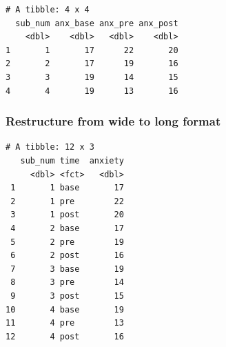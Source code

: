 \documentclass[
]{article}
\newenvironment{Shaded}{\begin{snugshade}}{\end{snugshade}}
\newcommand{\CommentTok}[1]{\textcolor[rgb]{0.56,0.35,0.01}{\textit{#1}}}
\newcommand{\DataTypeTok}[1]{\textcolor[rgb]{0.13,0.29,0.53}{#1}}
\newcommand{\DecValTok}[1]{\textcolor[rgb]{0.00,0.00,0.81}{#1}}
\newcommand{\KeywordTok}[1]{\textcolor[rgb]{0.13,0.29,0.53}{\textbf{#1}}}
\newcommand{\NormalTok}[1]{#1}
\newcommand{\OperatorTok}[1]{\textcolor[rgb]{0.81,0.36,0.00}{\textbf{#1}}}
\newcommand{\StringTok}[1]{\textcolor[rgb]{0.31,0.60,0.02}{#1}}
\begin{document}
\begin{verbatim}
# A tibble: 4 x 4
  sub_num anx_base anx_pre anx_post
    <dbl>    <dbl>   <dbl>    <dbl>
1       1       17      22       20
2       2       17      19       16
3       3       19      14       15
4       4       19      13       16
\end{verbatim}

\hypertarget{restructure-from-wide-to-long-format-5}{%
\subsubsection{Restructure from wide to long
format}\label{restructure-from-wide-to-long-format-5}}

\begin{Shaded}
\end{Shaded}

\begin{Shaded}
\end{Shaded}

\begin{verbatim}
# A tibble: 12 x 3
   sub_num time  anxiety
     <dbl> <fct>   <dbl>
 1       1 base       17
 2       1 pre        22
 3       1 post       20
 4       2 base       17
 5       2 pre        19
 6       2 post       16
 7       3 base       19
 8       3 pre        14
 9       3 post       15
10       4 base       19
11       4 pre        13
12       4 post       16
\end{verbatim}
\end{document}
